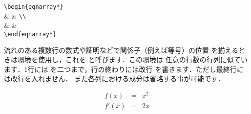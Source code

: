 \begin{Syntax}
\verb|\begin{eqnarray*}| \\
 \str&  \str&  \verb|\\| \\
 \str&  \str&  \\
\verb|\end{eqnarray*}|
\end{Syntax}
流れのある複数行の数式や証明などで関係子（例えば等号\qu{$=$}）の位置
を揃えるときは環境を使用し，これを
{}と呼びます．この環境は
任意の行数の行列に似ています．1行には%
\qu{\str{&}}を二つまで，行の終わりには改行\qu{\texttt{\bs\bs}}%
を書きます．ただし最終行には改行を入れません．
また各列における成分は省略する事が可能です．
\begin{InOut}
\begin{eqnarray*}
f(x)      & = & x^2  \\
f'(x)     & = & 2x   
\end{eqnarray*}
\end{InOut}


